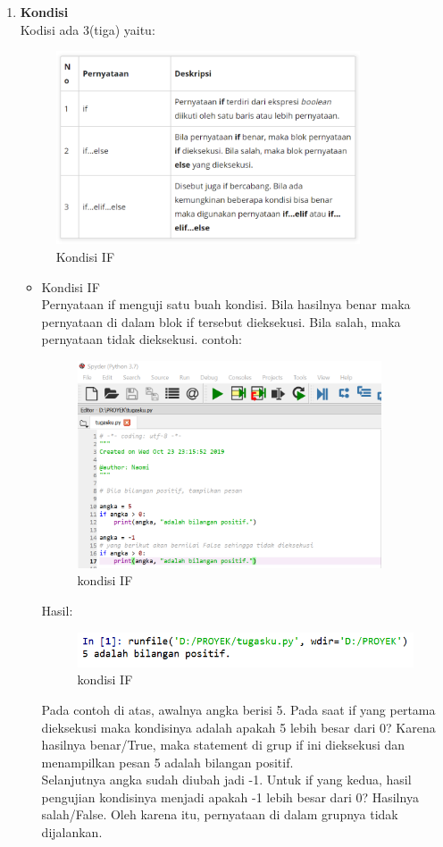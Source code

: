 \begin{enumerate}
\newpage
\item \textbf{Kondisi}\\
    Kodisi ada 3(tiga) yaitu:
    \begin{figure}[!htbp]
    \centering
    \includegraphics[width=9cm]{gambar2/cthkondisi.png}
    \caption{Kondisi IF}
    \end{figure}
    \begin{itemize}
        \item Kondisi IF\\
        Pernyataan if menguji satu buah kondisi. Bila hasilnya benar maka pernyataan di dalam blok if tersebut dieksekusi. Bila salah, maka pernyataan tidak dieksekusi. contoh:
    \begin{figure}[!htbp]
    \centering
    \includegraphics[width=9cm]{gambar2/if.png}
    \caption{kondisi IF}
    \end{figure}
    Hasil:
    \begin{figure}[!htbp]
    \centering
    \includegraphics[width=10cm]{gambar2/if1.png}
    \caption{kondisi IF}
    \end{figure}
    \newpage
        Pada contoh di atas, awalnya angka berisi 5. Pada saat if yang pertama dieksekusi maka kondisinya adalah apakah 5 lebih besar dari 0? Karena hasilnya benar/True, maka statement di grup if ini dieksekusi dan menampilkan pesan 5 adalah bilangan positif.\\
        Selanjutnya angka sudah diubah jadi -1. Untuk if yang kedua, hasil pengujian kondisinya menjadi apakah -1 lebih besar dari 0? Hasilnya salah/False. Oleh karena itu, pernyataan di dalam grupnya tidak dijalankan.


\end{itemize}
\end{enumerate}
